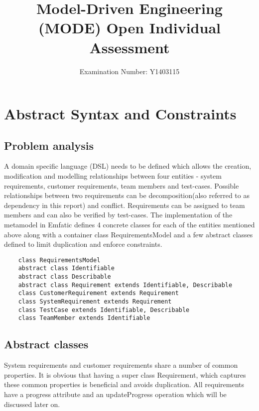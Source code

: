 \documentclass[11pt,a4paper]{article}
\title{Model-Driven Engineering (MODE) Open Individual Assessment}
\author{Examination Number: Y1403115}
\date{}
\begin{document}
	
\maketitle

\section{Abstract Syntax and Constraints}

	\subsection{Problem analysis}
	A domain specific language (DSL) needs to be defined which allows the creation, modification and modelling relationships between four entities - system requirements, customer requirements, team members and test-cases. Possible relationships between two requirements can be decomposition(also referred to as dependency in this report) and conflict. Requirements can be assigned to team members and can also be verified by test-cases. 
	The implementation of the metamodel in Emfatic defines 4 concrete classes for each of the entities mentioned above along with a container class RequirementsModel and a few abstract classes defined to limit duplication and enforce constraints.
	
	\begin{lstlisting}
	class RequirementsModel
	abstract class Identifiable
	abstract class Describable
	abstract class Requirement extends Identifiable, Describable
	class CustomerRequirement extends Requirement
	class SystemRequirement extends Requirement
	class TestCase extends Identifiable, Describable
	class TeamMember extends Identifiable
	\end{lstlisting}
	
	\subsection{Abstract classes}
	System requirements and customer requirements share a number of common properties. It is obvious that having a super class Requirement, which captures these common properties is beneficial and avoids duplication. All requirements have a progress attribute and an updateProgress operation which will be discussed later on.
	
\end{document}
